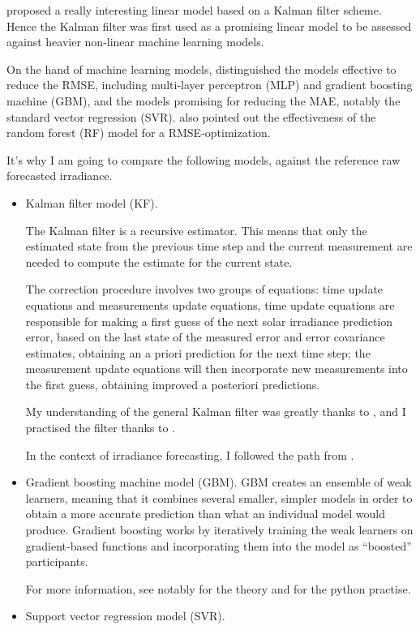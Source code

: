 \cite{suksamosorn_post-processing_2021} proposed a really interesting linear model based on a Kalman filter scheme. Hence the Kalman filter was first used as a promising linear model to be 
assessed against heavier non-linear machine learning models.

On the hand of machine learning models, \cite{verbois_statistical_2022} distinguished the models effective to reduce the RMSE, including multi-layer perceptron (MLP) and gradient boosting machine (GBM),
and the models promising for reducing the MAE, notably the standard vector regression (SVR).
\cite{suksamosorn_post-processing_2021} also pointed out the effectiveness of the random forest (RF) model for a RMSE-optimization.

It's why I am going to compare the following models, against the reference raw forecasted irradiance.
\begin{itemize}
    \item Kalman filter model (KF).

The Kalman filter is a recursive estimator. This means that only the estimated state from the previous time step and the current measurement are needed to compute the estimate for the current state.

The correction procedure involves two groups of equations: time update equations
and measurements update equations, time update equations are responsible for making
a first guess of the next solar irradiance prediction error, based on the last state of the
measured error and error covariance estimates, obtaining an a priori prediction for the next
time step; the measurement update equations will then incorporate new measurements
into the first guess, obtaining improved a posteriori predictions.

My understanding of the general Kalman filter was greatly thanks to \cite{kfbasis}, and I practised the filter thanks to \cite{kfpractise}.

In the context of irradiance forecasting, I followed the path from \cite{suksamosorn_post-processing_2021}.
    \item Gradient boosting machine model (GBM).
GBM creates an ensemble of weak learners, meaning that it combines several smaller, simpler models in order to obtain a more accurate prediction than what an individual model would produce. Gradient boosting works by iteratively training the weak learners on gradient-based functions and incorporating them into the model as “boosted” participants. 

For more information, see notably \cite{GBMbasis} for the theory and \cite{GBMpractise} for the python practise.
    \item Support vector regression model (SVR).


\end{itemize}
